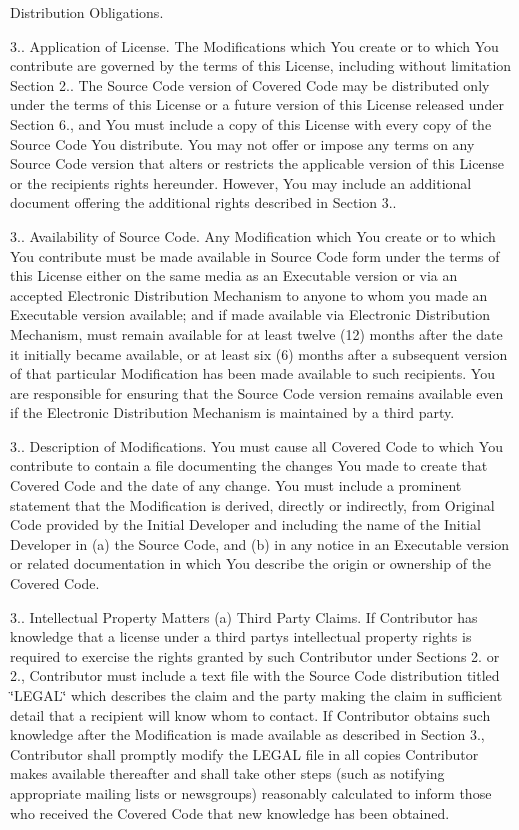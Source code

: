 \begin{DoxyEnumerate}
\item Distribution Obligations.

3.. Application of License. The Modifications which You create or to which You contribute are governed by the terms of this License, including without limitation Section 2.. The Source Code version of Covered Code may be distributed only under the terms of this License or a future version of this License released under Section 6., and You must include a copy of this License with every copy of the Source Code You distribute. You may not offer or impose any terms on any Source Code version that alters or restricts the applicable version of this License or the recipients\textquotesingle{} rights hereunder. However, You may include an additional document offering the additional rights described in Section 3..

3.. Availability of Source Code. Any Modification which You create or to which You contribute must be made available in Source Code form under the terms of this License either on the same media as an Executable version or via an accepted Electronic Distribution Mechanism to anyone to whom you made an Executable version available; and if made available via Electronic Distribution Mechanism, must remain available for at least twelve (12) months after the date it initially became available, or at least six (6) months after a subsequent version of that particular Modification has been made available to such recipients. You are responsible for ensuring that the Source Code version remains available even if the Electronic Distribution Mechanism is maintained by a third party.

3.. Description of Modifications. You must cause all Covered Code to which You contribute to contain a file documenting the changes You made to create that Covered Code and the date of any change. You must include a prominent statement that the Modification is derived, directly or indirectly, from Original Code provided by the Initial Developer and including the name of the Initial Developer in (a) the Source Code, and (b) in any notice in an Executable version or related documentation in which You describe the origin or ownership of the Covered Code.

3.. Intellectual Property Matters (a) Third Party Claims. If Contributor has knowledge that a license under a third party\textquotesingle{}s intellectual property rights is required to exercise the rights granted by such Contributor under Sections 2. or 2., Contributor must include a text file with the Source Code distribution titled \char`\"{}\+L\+E\+G\+A\+L\char`\"{} which describes the claim and the party making the claim in sufficient detail that a recipient will know whom to contact. If Contributor obtains such knowledge after the Modification is made available as described in Section 3., Contributor shall promptly modify the L\+E\+G\+A\+L file in all copies Contributor makes available thereafter and shall take other steps (such as notifying appropriate mailing lists or newsgroups) reasonably calculated to inform those who received the Covered Code that new knowledge has been obtained.


\end{DoxyEnumerate}

